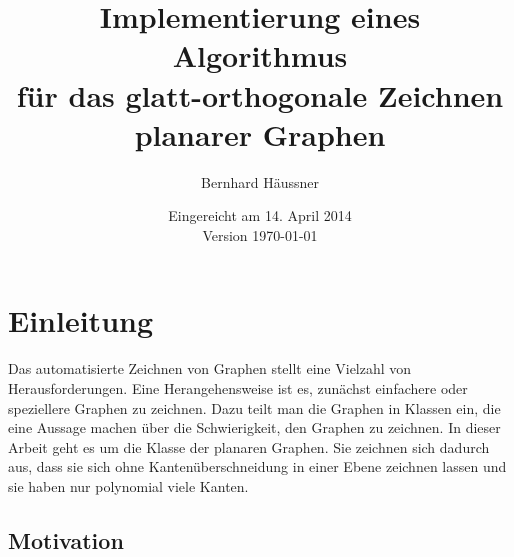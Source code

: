 \documentclass[a4paper]{scrreprt}
\theoremstyle{definition}
\begin{document}


\subject{Bachelorarbeit}
\title{Implementierung eines Algorithmus\\ für das glatt-orthogonale Zeichnen \\ planarer Graphen} %
\author{Bernhard Häussner} %
\date{Eingereicht am 14. April 2014 \\ Version \today} %
\titlehead{Julius-Maximilians-Universität Würzburg\\
Institut für Informatik\\
Lehrstuhl für Informatik I\\
Effiziente Algorithmen und wissensbasierte Systeme}
\publishers{Betreuer:\\
Prof.\ Dr.\ Alexander Wolff\\
Dipl.-Inf.\ Philipp Kindermann} %
\maketitle
\tableofcontents









\chapter{Einleitung}
\label{chap:intro}

Das automatisierte Zeichnen von Graphen stellt eine Vielzahl von Herausforderungen. 
Eine Herangehensweise ist es, zunächst einfachere oder speziellere Graphen zu zeichnen. 
Dazu teilt man die Graphen in Klassen ein, die eine Aussage machen über die Schwierigkeit, den Graphen zu zeichnen. 
In dieser Arbeit geht es um die Klasse der planaren Graphen. Sie zeichnen sich dadurch aus, dass sie sich ohne Kantenüberschneidung in einer Ebene zeichnen lassen und sie haben nur polynomial viele Kanten.

\section{Motivation}
\end{document}
